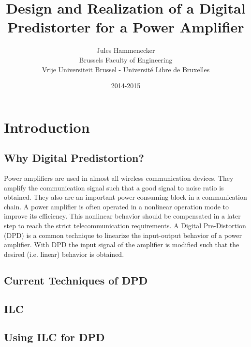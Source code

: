 \documentclass[a4paper]{report}
\begin{document}
\title{Design and Realization of a Digital Predistorter for a Power Amplifier}

\author{Jules Hammenecker \\ Brussels Faculty of Engineering \\ Vrije Universiteit Brussel - Universit\'e Libre de Bruxelles}
\date{2014-2015 }

\maketitle
\begin{abstract}

\end{abstract}

\tableofcontents
\chapter{Introduction}
	\section{Why Digital Predistortion?}
	Power amplifiers are used in almost all wireless communication devices. They amplify the communication signal such that a good signal to noise ratio is obtained. They also are an important power consuming block in a communication chain. A power amplifier is often operated in a nonlinear operation mode to improve its efficiency. This nonlinear behavior should be compensated in a later step to reach the strict telecommunication requirements.
	A Digital Pre-Distortion (DPD) is a common technique to linearize the input-output behavior of a power amplifier. With DPD the input signal of the amplifier is modified such that the desired (i.e. linear) behavior is obtained. 

	\section{Current Techniques of DPD}
	\section{ILC}
	\section{Using ILC for DPD}
		\subsection{}
\end{document}
